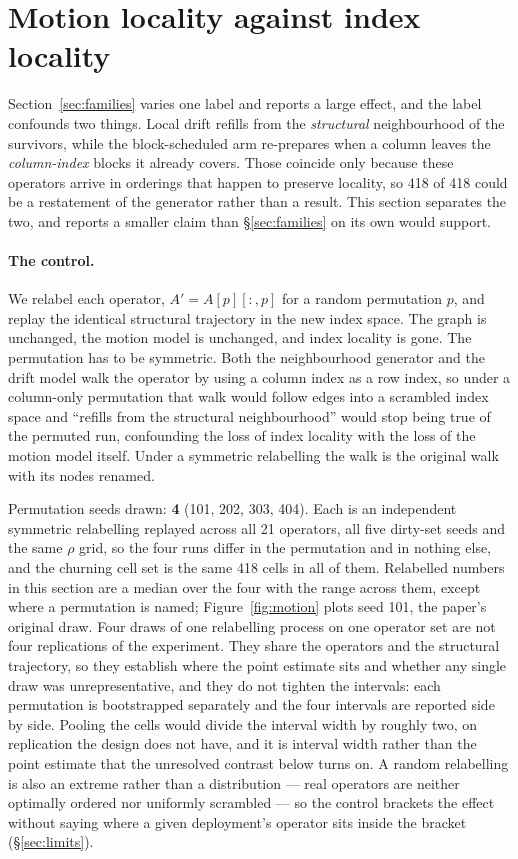 \documentclass{article}
\begin{document}
\section{Motion locality against index locality}
\label{sec:control}

Section~\ref{sec:families} varies one label and reports a large effect, and the
label confounds two things. Local drift refills from the \emph{structural}
neighbourhood of the survivors, while the block-scheduled arm re-prepares when a
column leaves the \emph{column-index} blocks it already covers. Those coincide
only because these operators arrive in orderings that happen to preserve
locality, so 418 of 418 could be a restatement of the generator rather than a
result. This section separates the two, and reports a smaller claim than
\S\ref{sec:families} on its own would support.

\paragraph{The control.}
We relabel each operator, $A' = A[p][:,p]$ for a random permutation $p$, and
replay the identical structural trajectory in the new index space. The graph is
unchanged, the motion model is unchanged, and index locality is gone. The
permutation has to be symmetric. Both the neighbourhood generator and the drift
model walk the operator by using a column index as a row index, so under a
column-only permutation that walk would follow edges into a scrambled index
space and ``refills from the structural neighbourhood'' would stop being true of
the permuted run, confounding the loss of index locality with the loss of the
motion model itself. Under a symmetric relabelling the walk is the original walk
with its nodes renamed.

Permutation seeds drawn: \textbf{4} (101, 202, 303, 404). Each is an independent
symmetric relabelling replayed across all 21 operators, all five dirty-set seeds
and the same $\rho$ grid, so the four runs differ in the permutation and in
nothing else, and the churning cell set is the same 418 cells in all of them.
Relabelled numbers in this section are a median over the four with the range
across them, except where a permutation is named; Figure~\ref{fig:motion} plots
seed 101, the paper's original draw.
Four draws of one relabelling process on one operator set are not four
replications of the experiment. They share the operators and the structural
trajectory, so they establish where the point estimate sits and whether any
single draw was unrepresentative, and they do not tighten the intervals: each
permutation is bootstrapped separately and the four intervals are reported side
by side. Pooling the cells would divide the interval width by roughly two, on
replication the design does not have, and it is interval width rather than the
point estimate that the unresolved contrast below turns on.
A random relabelling is also an extreme rather than a distribution --- real operators are neither
optimally ordered nor uniformly scrambled --- so the control brackets the effect
without saying where a given deployment's operator sits inside the bracket
(\S\ref{sec:limits}).
\end{document}
